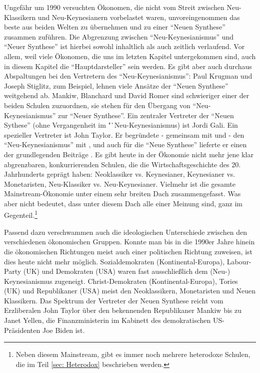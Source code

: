 Ungefähr um 1990 versuchten Ökonomen, die nicht vom Streit zwischen Neu-Klassikern und Neu-Keynesianern vorbelastet waren, unvoreingenommen das beste aus beiden Welten zu übernehmen und zu einer "`Neuen Synthese"' zusammen zuführen. Die Abgrenzung zwischen "`Neu-Keynesianismus"' und "`Neuer Synthese"' ist hierbei sowohl inhaltlich als auch zeitlich verlaufend. Vor allem, weil viele Ökonomen, die uns im letzten Kapitel untergekommen sind, auch in diesem Kapitel die "`Hauptdarsteller"' sein werden. Es gibt aber auch durchaus Abspaltungen bei den Vertretern des "`Neu-Keynesianismus"': Paul Krugman und Joseph Stiglitz, zum Beispiel, lehnen viele Ansätze der "`Neuen Synthese"' weitgehend ab. Mankiw, Blanchard und David Romer sind schwieriger einer der beiden Schulen zuzuordnen, sie stehen für den Übergang von "`Neu-Keynesianismus"' zur "`Neuer Synthese"'. Ein zentraler Vertreter der "`Neuen Sythese"' (ohne Vergangenheit im "`Neu-Keynesianismus) ist Jordi Gali. Ein spezieller Vertreter ist John Taylor. Er begründete - gemeinsam mit \textcite{Phelps1968} und \textcite{Fischer1977} - den "`Neu-Keynesianismus"' mit \parencite{Taylor1977}, und auch für die "`Neue Synthese"' lieferte er einen der grundlegenden Beiträge \parencite{Taylor1993}. Es gibt heute in der Ökonomie nicht mehr jene klar abgrenzbaren, konkurrierenden Schulen, die die Wirtschaftsgeschichte des 20. Jahrhunderts geprägt haben: Neoklassiker vs. Keynesianer, Keynesianer vs. Monetaristen, Neu-Klassiker vs. Neu-Keynesianer. Vielmehr ist die gesamte Mainstream-Ökonomie unter einem sehr breiten Dach zusammengefasst. Was aber nicht bedeutet, dass unter diesem Dach alle einer Meinung sind, ganz im Gegenteil.\footnote{Neben diesem Mainstream, gibt es immer noch mehrere heterodoxe Schulen, die im Teil \ref{sec: Heterodox} beschrieben werden.}

Passend dazu verschwammen auch die ideologischen Unterschiede zwischen den verschiedenen ökonomischen Gruppen. Konnte man bis in die 1990er Jahre hinein die ökonomischen Richtungen meist auch einer politischen Richtung zuweisen, ist dies heute nicht mehr möglich. Sozialdemokraten (Kontinental-Europa), Labour-Party (UK) und Demokraten (USA) waren fast ausschließlich dem (Neu-) Keynesianismus zugeneigt. Christ-Demokraten (Kontinental-Europa), Tories (UK) und Republikaner (USA) meist den Neoklassikern,  Monetaristen und Neuen Klassikern. Das Spektrum der Vertreter der Neuen Synthese reicht vom Erzliberalen John Taylor über den bekennenden Republikaner Mankiw bis zu Janet Yellen, die Finanzministerin im Kabinett des demokratischen US-Präsidenten Joe Biden ist. 

